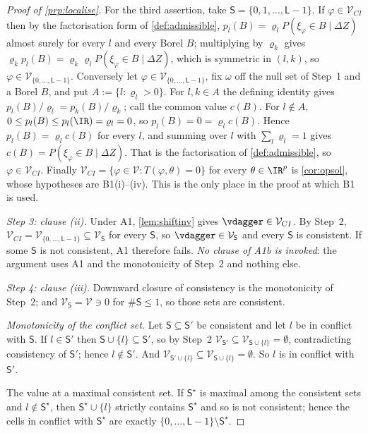 \begin{proof}[Proof of \cref{prp:localise}]
For the third assertion, take $\mathsf S=\{0,1,\dots,\mathsf L-1\}$. If $\varphi\in\mathcal V_{CI}$
then by the factorisation form of \cref{def:admissible}, $p_l(B)=\varrho_lP(\xi_\varphi\in B\mid\Delta Z)$
almost surely for every $l$ and every Borel $B$; multiplying by $\varrho_k$ gives
$\varrho_kp_l(B)=\varrho_k\varrho_lP(\xi_\varphi\in B\mid\Delta Z)$, which is symmetric in $(l,k)$,
so $\varphi\in\mathcal V_{\{0,\dots,\mathsf L-1\}}$. Conversely let
$\varphi\in\mathcal V_{\{0,\dots,\mathsf L-1\}}$, fix $\omega$ off the null set of Step~1 and a Borel
$B$, and put $A:=\{l:\varrho_l>0\}$. For $l,k\in A$ the defining identity gives
$p_l(B)/\varrho_l=p_k(B)/\varrho_k$; call the common value $c(B)$. For $l\notin A$,
$0\le p_l(B)\le p_l(\IR)=\varrho_l=0$, so $p_l(B)=0=\varrho_lc(B)$. Hence $p_l(B)=\varrho_lc(B)$ for
every $l$, and summing over $l$ with $\sum_l\varrho_l=1$ gives $c(B)=P(\xi_\varphi\in B\mid\Delta Z)$.
That is the factorisation of \cref{def:admissible}, so $\varphi\in\mathcal V_{CI}$. Finally
$\mathcal V_{CI}=\{\varphi\in\mathcal V:T(\varphi,\theta)=0\}$ for every $\theta\in\IR^{p}$ is
\cref{cor:opsol}, whose hypotheses are B1(i)--(iv). This is the only place in the proof at
which B1 is used.

\emph{Step 3: clause \textup{(ii)}.} Under A1, \cref{lem:shiftinv} gives $\vdagger\in\mathcal V_{CI}$.
By Step~2, $\mathcal V_{CI}=\mathcal V_{\{0,\dots,\mathsf L-1\}}\subseteq\mathcal V_{\mathsf S}$ for
every $\mathsf S$, so $\vdagger\in\mathcal V_{\mathsf S}$ and every $\mathsf S$ is consistent. If some
$\mathsf S$ is not consistent, A1 therefore fails. \emph{No clause of A1b is invoked}: the argument
uses A1 and the monotonicity of Step~2 and nothing else.

\emph{Step 4: clause \textup{(iii)}.} Downward closure of consistency is the monotonicity of Step~2;
and $\mathcal V_{\mathsf S}=\mathcal V\ni0$ for $\#\mathsf S\le1$, so those sets are consistent.

\emph{Monotonicity of the conflict set.} Let $\mathsf S\subseteq\mathsf S'$ be consistent and let $l$
be in conflict with $\mathsf S$. If $l\in\mathsf S'$ then $\mathsf S\cup\{l\}\subseteq\mathsf S'$, so
by Step~2 $\mathcal V_{\mathsf S'}\subseteq\mathcal V_{\mathsf S\cup\{l\}}=\emptyset$, contradicting
consistency of $\mathsf S'$; hence $l\notin\mathsf S'$. And
$\mathcal V_{\mathsf S'\cup\{l\}}\subseteq\mathcal V_{\mathsf S\cup\{l\}}=\emptyset$. So $l$ is in
conflict with $\mathsf S'$.

The value at a maximal consistent set. If $\mathsf S^{\star}$ is maximal among the consistent
sets and $l\notin\mathsf S^{\star}$, then $\mathsf S^{\star}\cup\{l\}$ strictly contains
$\mathsf S^{\star}$ and so is not consistent; hence the cells in conflict with $\mathsf S^{\star}$ are
exactly $\{0,\dots,\mathsf L-1\}\setminus\mathsf S^{\star}$.


\end{proof}
